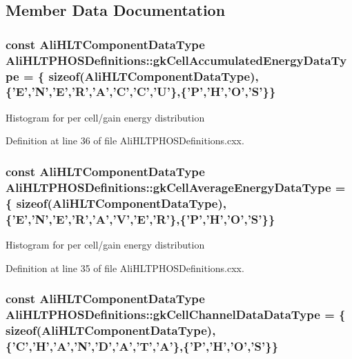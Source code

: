 \subsection{Member Data Documentation}
\subsubsection{\setlength{\rightskip}{0pt plus 5cm}const {\bf Ali\-HLTComponent\-Data\-Type} {\bf Ali\-HLTPHOSDefinitions::gk\-Cell\-Accumulated\-Energy\-Data\-Type} = \{ sizeof({\bf Ali\-HLTComponent\-Data\-Type}), \{'E','N','E','R','A','C','C','U'\},\{'P','H','O','S'\}\}\hspace{0.3cm}{\tt  [static]}}\label{classAliHLTPHOSDefinitions_s4}


Histogram for per cell/gain energy distribution 

Definition at line 36 of file Ali\-HLTPHOSDefinitions.cxx.
\subsubsection{\setlength{\rightskip}{0pt plus 5cm}const {\bf Ali\-HLTComponent\-Data\-Type} {\bf Ali\-HLTPHOSDefinitions::gk\-Cell\-Average\-Energy\-Data\-Type} = \{ sizeof({\bf Ali\-HLTComponent\-Data\-Type}), \{'E','N','E','R','A','V','E','R'\},\{'P','H','O','S'\}\}\hspace{0.3cm}{\tt  [static]}}\label{classAliHLTPHOSDefinitions_s3}


Histogram for per cell/gain energy distribution 

Definition at line 35 of file Ali\-HLTPHOSDefinitions.cxx.
\subsubsection{\setlength{\rightskip}{0pt plus 5cm}const {\bf Ali\-HLTComponent\-Data\-Type} {\bf Ali\-HLTPHOSDefinitions::gk\-Cell\-Channel\-Data\-Data\-Type} = \{ sizeof({\bf Ali\-HLTComponent\-Data\-Type}), \{'C','H','A','N','D','A','T','A'\},\{'P','H','O','S'\}\}\hspace{0.3cm}{\tt  [static]}}\label{classAliHLTPHOSDefinitions_s7}


